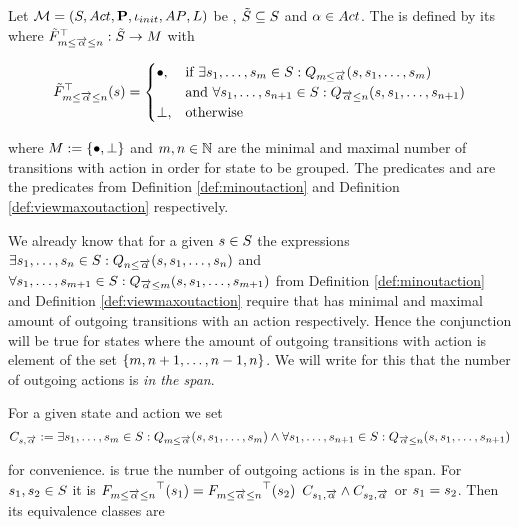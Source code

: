 \documentclass[preview]{standalone}
\begin{document}
\begin{definition}
	Let $\chgph = \chgphtuple$ be \achgphN, $\smstates \subseteq \states$ and $\action \in \actions$. The \viewN 
	\viewspanoutaction is defined by its \grpfctN where $\gfctsubspanoutaction : \smstates \to \imggrp$ with

	\[
	\gfctsubspanoutaction(\state) =
	\begin{cases}
			\remelem,				& \text{if } \exists \state_1, \dots, \state_\numoutactb \in \states: \predminoutact[\numoutactb] \\ &\text{and } \forall \state_1, \dots, \state_{\numoutact+1} \in \states: \predmaxoutact \\
			\notppty,          	& \text{otherwise}
		\end{cases}
	\]
	
	where $\imggrp := \imggrpbinview$
	and $\numoutactb, \numoutact \in \natnums$ are the minimal and maximal number of transitions with action \action in order for state to be grouped. The predicates \predminoutact and \predmaxoutact are the predicates from Definition \ref{def:minoutaction} and Definition \ref{def:viewmaxoutaction} respectively.
\end{definition}

We already know that for a given $\state \in \states$ the expressions $\exists \state_1, \dots, \state_\numoutact \in \states: \predminoutact$ and $\forall \state_1, \dots, \state_{\numoutactb+1} \in \states: \predmaxoutact[\numoutactb]$ from Definition \ref{def:minoutaction} and Definition \ref{def:viewmaxoutaction} require that \state has minimal and maximal amount of outgoing transitions with an action \action respectively. Hence the conjunction will be true for states where the amount of outgoing transitions with action \action is element of the set $\{\numoutactb, \numoutact+1, \dots, \numoutact-1, \numoutact\}$. We will write for this that the number of outgoing actions is \emph{in the span}.

For a given state \state and action \action we set
\[
\formoutact:= \exists \state_1, \dots, \state_\numoutactb \in \states: \predminoutact[\numoutactb]\land \\
\forall \state_1, \dots, \state_{\numoutact+1} \in \states: \predmaxoutact
\]

for convenience. \formoutact is true  \iffN the number of outgoing actions is in the span. For $\state_1, \state_2 \in \states$ it is $\gfctspanoutaction(\state_1) = \gfctspanoutaction(\state_2)$ \iffN $\formoutact[\state_1] \land \formoutact[\state_2]$ or $\state_1 = \state_2$. Then its equivalence classes are
\end{document}
